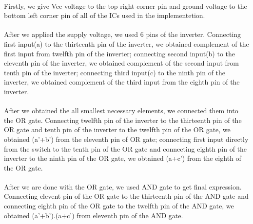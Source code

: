 \documentclass[pdftex,12pt,a4paper]{article}
\begin{document}
\paragraph{}

Firstly, we give Vcc voltage to the top right corner pin and ground voltage to the bottom left corner pin of all of the ICs used in the implementetion.

\paragraph{}

After we applied the supply voltage, we used 6 pins of the inverter. Connecting first input(a) to the thirteenth pin of the inverter, we obtained complement of the first input from twelfth pin of the inverter; connecting second input(b) to the eleventh pin of the inverter, we obtained complement of the second input from tenth pin of the inverter; connecting third input(c) to the ninth pin of the inverter, we obtained complement of the third input from the eighth pin of the inverter.

\paragraph{}

After we obtained the all smallest necessary elements, we connected them into the OR gate. Connecting twelfth pin of the inverter to the thirteenth pin of the OR gate and tenth pin of the inverter to the twelfth pin of the OR gate, we obtained (a'+b') from the eleventh pin of OR gate; connecting first input directly from the switch to the tenth pin of the OR gate and connecting eighth pin of the inverter to the ninth pin of the OR gate, we obtained (a+c') from the eighth of the OR gate.

\paragraph{}

After we are done with the OR gate, we used AND gate to get final expression. Connecting elevent pin of the OR gate to the thirteenth pin of the AND gate and  connecting eighth pin of the OR gate to the twelfth pin of the AND gate, we obtained (a'+b').(a+c') from eleventh pin of the AND gate.

\paragraph{}
\end{document}
